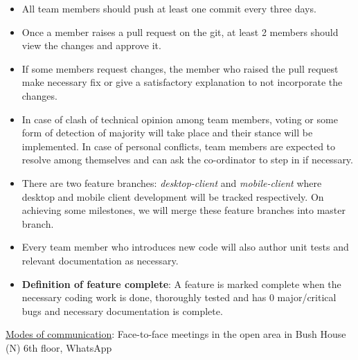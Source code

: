\begin{itemize}

\item All team members should push at least one commit every three days.

\item Once a member raises a pull request on the git, at least 2 members should view the changes and approve it.

\item If some members request changes, the member who raised the pull request make necessary fix or give a satisfactory explanation to not incorporate the changes.

\item In case of clash of technical opinion among team members, voting or some form of detection of majority will take place and their stance will be implemented. In case of personal conflicts, team members are expected to resolve among themselves and can ask the co-ordinator to step in if necessary.

\item There are two feature branches: \emph{desktop-client} and \emph{mobile-client} where desktop and mobile client development will be tracked respectively. On achieving some milestones, we will merge these feature branches into master branch.

\item Every team member who introduces new code will also author unit tests and relevant documentation as necessary.

\item \textbf{Definition of feature complete}: A feature is marked complete when the necessary coding work is done, thoroughly tested and has 0 major/critical bugs and necessary documentation is complete.

\end{itemize}

\underline{Modes of communication}: Face-to-face meetings in the open area in Bush House (N) 6th floor, WhatsApp
